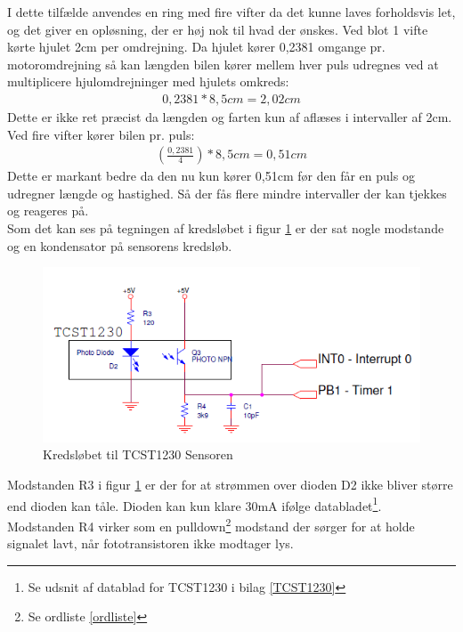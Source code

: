 I dette tilfælde anvendes en ring med fire vifter da det kunne laves forholdsvis let, og det giver en opløsning, der er høj nok til hvad der ønskes. Ved blot 1 vifte kørte hjulet 2cm per omdrejning. Da hjulet kører 0,2381 omgange pr. motoromdrejning så kan længden bilen kører mellem hver puls udregnes ved at multiplicere hjulomdrejninger med hjulets omkreds:
\begin{align*}
0,2381*8,5cm = 2,02 cm
\end{align*}
Dette er ikke ret præcist da længden og farten kun af aflæses i intervaller af 2cm. Ved fire vifter kører bilen pr. puls:
\begin{align*}
(\frac{0,2381}{4})* 8,5cm = 0,51cm
\end{align*}
Dette er markant bedre da den nu kun kører 0,51cm før den får en puls og udregner længde og hastighed. Så der fås flere mindre intervaller der kan tjekkes og reageres på. \\ 

Som det kan ses på tegningen af kredsløbet i figur \ref{wheelspeedTegning} er der sat nogle modstande og en kondensator på sensorens kredsløb. \\

\begin{figure}[h!]
\center
\includegraphics[scale=0.75]{./Graphics/TCST1230}
\caption{Kredsløbet til TCST1230 Sensoren}
\label{wheelspeedTegning}
\end{figure}

Modstanden R3 i figur \ref{wheelspeedTegning} er der for at strømmen over dioden D2 ikke bliver større end dioden kan tåle. Dioden kan kun klare 30mA ifølge databladet\footnote{Se udsnit af datablad for TCST1230 i bilag \ref{TCST1230}}.\\

Modstanden R4 virker som en pulldown\footnote{Se ordliste \ref{ordliste}} modstand der sørger for at holde signalet lavt, når fototransistoren ikke modtager lys. \\

